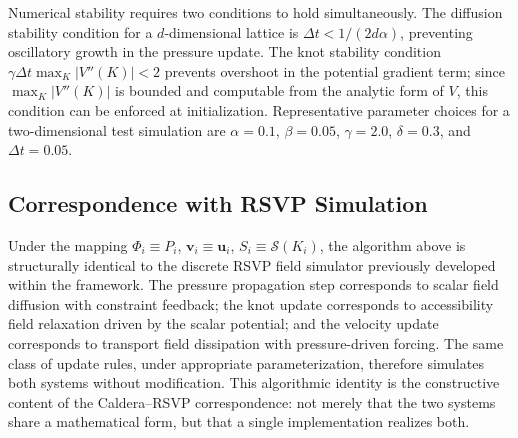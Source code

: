 \documentclass[12pt, a4paper]{article}
\begin{document}
Numerical stability requires two conditions to hold simultaneously. The diffusion stability condition for a $d$-dimensional lattice is $\Delta t < 1/(2d\alpha)$, preventing oscillatory growth in the pressure update. The knot stability condition $\gamma \Delta t \max_K |V''(K)| < 2$ prevents overshoot in the potential gradient term; since $\max_K |V''(K)|$ is bounded and computable from the analytic form of $V$, this condition can be enforced at initialization. Representative parameter choices for a two-dimensional test simulation are $\alpha = 0.1$, $\beta = 0.05$, $\gamma = 2.0$, $\delta = 0.3$, and $\Delta t = 0.05$.

\subsection{Correspondence with RSVP Simulation}

Under the mapping $\Phi_i \equiv P_i$, $\mathbf{v}_i \equiv \mathbf{u}_i$, $S_i \equiv \mathcal{S}(K_i)$, the algorithm above is structurally identical to the discrete RSVP field simulator previously developed within the framework. The pressure propagation step corresponds to scalar field diffusion with constraint feedback; the knot update corresponds to accessibility field relaxation driven by the scalar potential; and the velocity update corresponds to transport field dissipation with pressure-driven forcing. The same class of update rules, under appropriate parameterization, therefore simulates both systems without modification. This algorithmic identity is the constructive content of the Caldera--RSVP correspondence: not merely that the two systems share a mathematical form, but that a single implementation realizes both.
\end{document}
